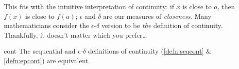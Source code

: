 
This fits with the intuitive interpretation of continuity: if $x$ is close to $a$, then $f(x)$ is close to $f(a)$; $\epsilon$ and $\delta$ are our measures of \emph{closeness}. Many mathematicians consider the $\epsilon$-$\delta$ version to be \emph{the} definition of continuity. Thankfully, it doesn't matter which you prefer\ldots

\begin{thm}{}{cont}
	The sequential and $\epsilon$-$\delta$ definitions of continuity (\ref{defn:seqcont} \& \ref{defn:epcont}) are equivalent.
\end{thm}



